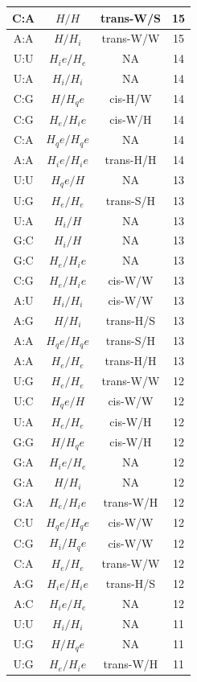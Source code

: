 \begin{center}
\begin{longtable}{c|c|c|c}
C:A & $H/H$ & trans-W/S & 15 \\  \hline
A:A & $H/H_i$ & trans-W/W & 15 \\  \hline
U:U & $H_ie/H_e$ & NA & 14 \\  \hline
U:A & $H_i/H_i$ & NA & 14 \\  \hline
C:G & $H/H_qe$ & cis-H/W & 14 \\  \hline
C:G & $H_e/H_ie$ & cis-W/H & 14 \\  \hline
C:A & $H_qe/H_qe$ & NA & 14 \\  \hline
A:A & $H_ie/H_ie$ & trans-H/H & 14 \\  \hline
U:U & $H_qe/H$ & NA & 13 \\  \hline
U:G & $H_e/H_e$ & trans-S/H & 13 \\  \hline
U:A & $H_i/H$ & NA & 13 \\  \hline
G:C & $H_i/H$ & NA & 13 \\  \hline
G:C & $H_e/H_ie$ & NA & 13 \\  \hline
C:G & $H_e/H_ie$ & cis-W/W & 13 \\  \hline
A:U & $H_i/H_i$ & cis-W/W & 13 \\  \hline
A:G & $H/H_i$ & trans-H/S & 13 \\  \hline
A:A & $H_qe/H_qe$ & trans-S/H & 13 \\  \hline
A:A & $H_e/H_e$ & trans-H/H & 13 \\  \hline
U:G & $H_e/H_e$ & trans-W/W & 12 \\  \hline
U:C & $H_qe/H$ & cis-W/W & 12 \\  \hline
U:A & $H_e/H_e$ & cis-W/H & 12 \\  \hline
G:G & $H/H_qe$ & cis-W/H & 12 \\  \hline
G:A & $H_ie/H_e$ & NA & 12 \\  \hline
G:A & $H/H_i$ & NA & 12 \\  \hline
G:A & $H_e/H_ie$ & trans-W/H & 12 \\  \hline
C:U & $H_qe/H_qe$ & cis-W/W & 12 \\  \hline
C:G & $H_i/H_qe$ & cis-W/W & 12 \\  \hline
C:A & $H_e/H_e$ & trans-W/W & 12 \\  \hline
A:G & $H_ie/H_ie$ & trans-H/S & 12 \\  \hline
A:C & $H_ie/H_e$ & NA & 12 \\  \hline
U:U & $H_i/H_i$ & NA & 11 \\  \hline
U:G & $H/H_qe$ & NA & 11 \\  \hline
U:G & $H_e/H_ie$ & trans-W/H & 11 \\  \hline

\end{longtable}
\end{center}
